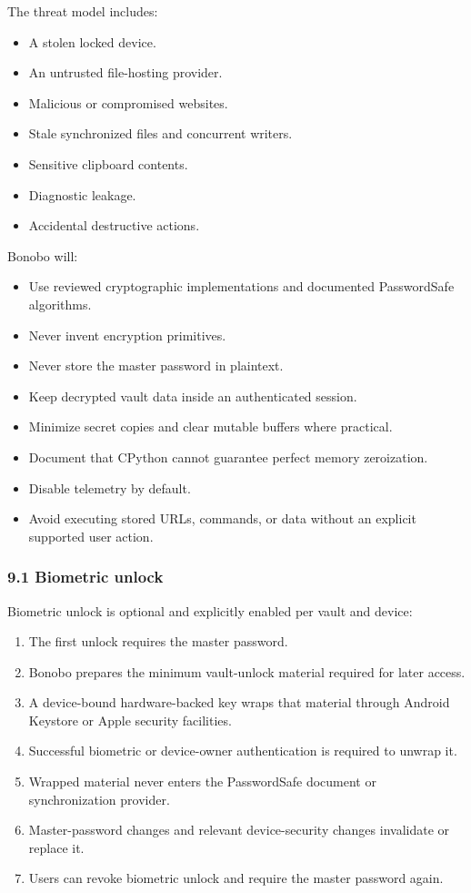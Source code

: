 \documentclass[
  letterpaper,
]{article}
\providecommand{\tightlist}{%
  \setlength{\itemsep}{0pt}\setlength{\parskip}{0pt}}
\begin{document}
The threat model includes:

\begin{itemize}
\tightlist
\item
  A stolen locked device.
\item
  An untrusted file-hosting provider.
\item
  Malicious or compromised websites.
\item
  Stale synchronized files and concurrent writers.
\item
  Sensitive clipboard contents.
\item
  Diagnostic leakage.
\item
  Accidental destructive actions.
\end{itemize}

Bonobo will:

\begin{itemize}
\tightlist
\item
  Use reviewed cryptographic implementations and documented PasswordSafe algorithms.
\item
  Never invent encryption primitives.
\item
  Never store the master password in plaintext.
\item
  Keep decrypted vault data inside an authenticated session.
\item
  Minimize secret copies and clear mutable buffers where practical.
\item
  Document that CPython cannot guarantee perfect memory zeroization.
\item
  Disable telemetry by default.
\item
  Avoid executing stored URLs, commands, or data without an explicit supported user action.
\end{itemize}

\subsubsection{9.1 Biometric unlock}\label{91-biometric-unlock}

Biometric unlock is optional and explicitly enabled per vault and device:

\begin{enumerate}
\def\labelenumi{\arabic{enumi}.}
\tightlist
\item
  The first unlock requires the master password.
\item
  Bonobo prepares the minimum vault-unlock material required for later access.
\item
  A device-bound hardware-backed key wraps that material through Android Keystore or Apple security facilities.
\item
  Successful biometric or device-owner authentication is required to unwrap it.
\item
  Wrapped material never enters the PasswordSafe document or synchronization provider.
\item
  Master-password changes and relevant device-security changes invalidate or replace it.
\item
  Users can revoke biometric unlock and require the master password again.
\end{enumerate}
\end{document}
